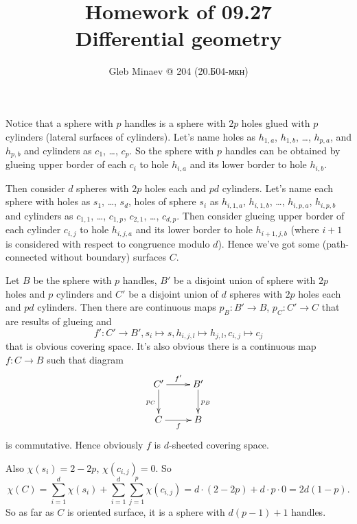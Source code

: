 \documentclass[12pt,a4paper]{article}
\title{Homework of 09.27\\Differential geometry}
\author{Gleb Minaev @ 204 (20.Б04-мкн)}
\date{}
\begin{document}
    \maketitle

    \begin{problem}{37}
        Notice that a sphere with $p$ handles is a sphere with $2p$ holes glued with $p$ cylinders (lateral surfaces of cylinders). Let's name holes as $h_{1, a}$, $h_{1, b}$, \dots, $h_{p, a}$, and $h_{p, b}$ and cylinders as $c_1$, \dots, $c_p$. So the sphere with $p$ handles can be obtained by glueing upper border of each $c_i$ to hole $h_{i, a}$ and its lower border to hole $h_{i, b}$.
        
        Then consider $d$ spheres with $2p$ holes each and $pd$ cylinders. Let's name each sphere with holes as $s_1$, \dots, $s_d$, holes of sphere $s_i$ as $h_{i, 1, a}$, $h_{i, 1, b}$, \dots, $h_{i, p, a}$, $h_{i, p, b}$ and cylinders as $c_{1, 1}$, \dots, $c_{1, p}$, $c_{2, 1}$, \dots, $c_{d, p}$. Then consider glueing upper border of each cylinder $c_{i, j}$ to hole $h_{i, j, a}$ and its lower border to hole $h_{i+1, j, b}$ (where $i+1$ is considered with respect to congruence modulo $d$). Hence we've got some (path-connected without boundary) surfaces $C$.

        Let $B$ be the sphere with $p$ handles, $B'$ be a disjoint union of sphere with $2p$ holes and $p$ cylinders and $C'$ be a disjoint union of $d$ spheres with $2p$ holes each and $pd$ cylinders. Then there are continuous maps $p_B: B' \to B$, $p_C: C' \to C$ that are results of glueing and
        \[f': C' \to B', s_i \mapsto s, h_{i, j, l} \mapsto h_{j, l}, c_{i, j} \mapsto c_{j}\]
        that is obvious covering space. It's also obvious there is a continuous map $f: C \to B$ such that diagram
        \[
            \xymatrix{
                C' \ar[r]^{f'} \ar[d]_{p_C} & B' \ar[d]^{p_B}\\
                C \ar[r]_{f} & B\\
            }
        \]
        is commutative. Hence obviously $f$ is $d$-sheeted covering space.

        Also $\chi(s_i) = 2 - 2p$, $\chi(c_{i, j}) = 0$. So
        \[\chi(C) = \sum_{i=1}^d \chi(s_i) + \sum_{i=1}^d \sum_{j=1}^p \chi(c_{i, j}) = d \cdot (2-2p) + d \cdot p \cdot 0 = 2d(1-p).\]
        So as far as $C$ is oriented surface, it is a sphere with $d(p-1) + 1$ handles.
    \end{problem}
\end{document}
